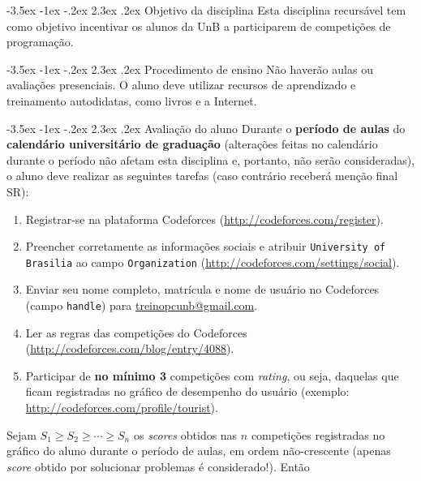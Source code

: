 \documentclass{UnBExam}%
\makeatletter
\newcommand{\numerocontests}{3}
\renewcommand\section{\@startsection{section}{1}{\z@}%
	{-3.5ex \@plus -1ex \@minus -.2ex}%
	{2.3ex \@plus.2ex}%
	{\normalfont\normalsize\bfseries}}%
\renewcommand{\indent}{\hspace{.5cm}}
\makeatother
\begin{document}
\section{Objetivo da disciplina}
\indent Esta disciplina recursável tem como objetivo incentivar os alunos da UnB a participarem de competições de programação.

\vspace{-.1cm}
\section{Procedimento de ensino}
\indent Não haverão aulas ou avaliações presenciais. O aluno deve utilizar recursos de aprendizado e treinamento autodidatas, como livros \cite{halim2013competitive,cormen2009introduction} e a Internet.

\vspace{-.1cm}
\section{Avaliação do aluno}
\indent Durante o \textbf{período de aulas} do \textbf{calendário universitário de graduação} (alterações feitas no calendário durante o período não afetam esta disciplina e, portanto, não serão consideradas), o aluno deve realizar as seguintes tarefas (caso contrário receberá menção final SR):
\begin{enumerate}
	\item Registrar-se na plataforma Codeforces (\url{http://codeforces.com/register}).
	\item Preencher corretamente as informações sociais e atribuir \texttt{University of Brasilia} ao campo \texttt{Organization} (\url{http://codeforces.com/settings/social}).
	\item Enviar seu nome completo, matrícula e nome de usuário no Codeforces (campo \texttt{handle}) para \url{treinopcunb@gmail.com}.
	\item Ler as regras das competições do Codeforces (\url{http://codeforces.com/blog/entry/4088}).
	\item Participar de \textbf{no mínimo \numerocontests} competições com \textit{rating}, ou seja, daquelas que ficam registradas no gráfico de desempenho do usuário (exemplo: \url{http://codeforces.com/profile/tourist}).
\end{enumerate}
\indent Sejam $S_1 \geq S_2 \geq \cdots \geq S_n$ os \textit{scores} obtidos nas $n$ competições registradas no gráfico do aluno durante o período de aulas, em ordem não-crescente (apenas \textit{score} obtido por solucionar problemas é considerado!). Então
\end{document}
